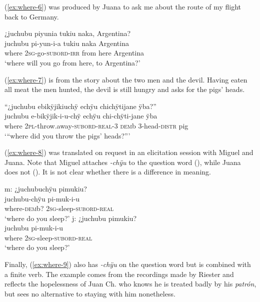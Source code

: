 (\ref{ex:where-6}) was produced by Juana to ask me about the route of my flight back to Germany.

\ea\label{ex:where-6}
\begingl
\glpreamble ¿juchubu piyunia tukiu naka, Argentina?\\
\gla juchubu pi-yun-i-a tukiu naka Argentina\\
\glb where 2\textsc{sg}-go-\textsc{subord}-\textsc{irr} from here Argentina\\
\glft ‘where will you go from here, to Argentina?’
\endgl
\trailingcitation{[jxx-e120516l-1.111]}
\xe

(\ref{ex:where-7}) is from the story about the two men and the devil. Having eaten all meat the men hunted, the devil is still hungry and asks for the pigs’ heads.

\ea\label{ex:where-7}
\begingl
\glpreamble “¿juchubu ebikÿjikiuchÿ echÿu chichÿtijane ÿba?”\\
\gla juchubu e-bikÿjik-i-u-chÿ echÿu chi-chÿti-jane ÿba\\
\glb where 2\textsc{pl}-throw.away-\textsc{subord}-\textsc{real}-3 \textsc{dem}b 3-head-\textsc{distr} pig\\
\glft ‘“where did you throw the pigs’ heads?”’
\endgl
\trailingcitation{[mxx-n101017s-1.046-048]}
\xe

(\ref{ex:where-8}) was translated on request in an elicitation session with Miguel and Juana. Note that Miguel attaches \textit{-chÿu} to the question word (), while Juana does not (). It is not clear whether there is a difference in meaning.

\ea\label{ex:where-8}
  \ea\label{ex:where-8.1}
\begingl
\glpreamble \textup{m:} ¿juchubuchÿu pimukiu?\\
\gla juchubu-chÿu pi-muk-i-u\\
\glb where-\textsc{dem}b? 2\textsc{sg}-sleep-\textsc{subord}-\textsc{real}\\
\glft ‘where do you sleep?’
\endgl
  \ex\label{ex:where-8.2}
\begingl
\glpreamble \textup{j:} ¿juchubu pimukiu? \\
\gla juchubu pi-muk-i-u\\
\glb where 2\textsc{sg}-sleep-\textsc{subord}-\textsc{real}\\
\glft ‘where do you sleep?’
\endgl
\trailingcitation{[jmx-e090727s.362-363]}
\z
\xe

Finally, (\ref{ex:where-9}) also has \textit{-chÿu} on the question word but is combined with a finite verb. The example comes from the recordings made by Riester and reflects the hopelessness of Juan Ch. who knows he is treated badly by his \textit{patrón}, but sees no alternative to staying with him nonetheless.

